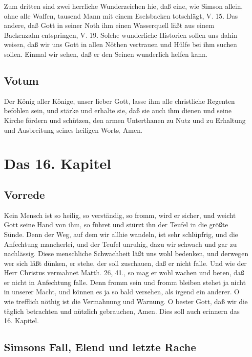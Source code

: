 Zum dritten sind zwei herrliche Wunderzeichen hie, daß eine, wie Simson allein, ohne alle Waffen, tausend Mann mit einem Eselsbacken totschlägt, V. 15. Das andere, daß Gott in seiner Noth ihm einen Wasserquell läßt aus einem Backenzahn entspringen, V. 19. Solche wunderliche Historien sollen uns dahin weisen, daß wir uns Gott in allen Nöthen vertrauen und Hülfe bei ihm suchen sollen. Einmal wir sehen, daß er den Seinen wunderlich helfen kann.

\section{Votum}

Der König aller Könige, unser lieber Gott, lasse ihm alle christliche Regenten befohlen sein, und stärke und erhalte sie, daß sie auch ihm dienen und seine Kirche fördern und schützen, den armen Unterthanen zu Nutz und zu Erhaltung und Ausbreitung seines heiligen Worts, Amen.

\chapter{Das 16. Kapitel}

\section{Vorrede}

Kein Mensch ist so heilig, so verständig, so fromm, wird er sicher, und weicht Gott seine Hand von ihm, so führet und stürzt ihn der Teufel in die größte Sünde. Denn der Weg, auf dem wir allhie wandeln, ist sehr schlüpfrig, und die Anfechtung mancherlei, und der Teufel unruhig, dazu wir schwach und gar zu nachlässig. Diese menschliche Schwachheit läßt uns wohl bedenken, und derwegen wer sich läßt dünken, er stehe, der soll zuschauen, daß er nicht falle. Und wie der Herr Christus vermahnet Matth. 26, 41., so mag er wohl wachen und beten, daß er nicht in Anfechtung falle. Denn fromm sein und fromm bleiben stehet ja nicht in unserer Macht, und können es ja so bald versehen, als irgend ein anderer. O wie trefflich nöthig ist die Vermahnung und Warnung. O bester Gott, daß wir die täglich betrachten und nützlich gebrauchen, Amen. Dies soll auch erinnern das 16. Kapitel.

\section{Simsons Fall, Elend und letzte Rache}
